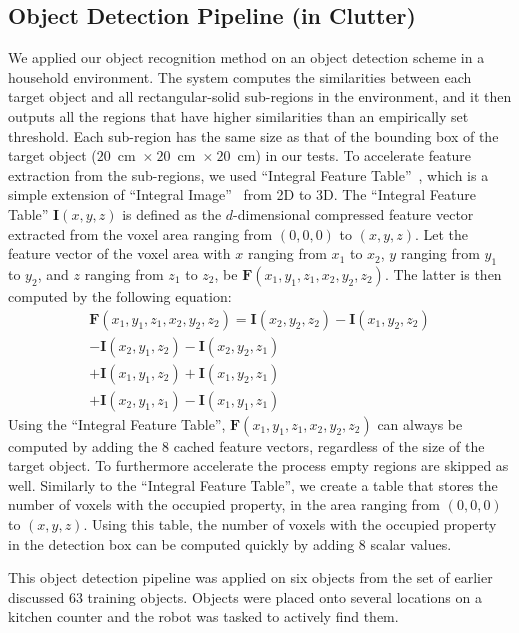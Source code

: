 \documentclass[letterpaper, 10 pt, conference]{sty/ieeeconf}
\begin{document}
\subsection{Object Detection Pipeline (in Clutter)}
\label{sec:recognition}
We applied our object recognition method on an object detection scheme in a household
environment. The system computes the similarities between each target object and all 
rectangular-solid sub-regions in the environment, and it then outputs all the regions
that have higher similarities than an empirically set threshold.
Each sub-region has the same size as that of the bounding box of the target object 
($20$~cm~$\times~20$~cm~$\times~20$~cm) in our tests.
To accelerate feature extraction from the sub-regions, we used ``Integral Feature Table''~\cite{kanezaki2010tvc}, 
which is a simple extension of ``Integral Image''~\cite{integral_image} from 2D to 3D.
The ``Integral Feature Table'' $\bm{I}(x,y,z)$ is defined as the $d$-dimensional 
compressed feature vector extracted from the voxel area ranging from $(0,0,0)$ to $(x,y,z)$.
Let the feature vector of the voxel area with $x$ ranging from $x_1$ to $x_2$,
$y$ ranging from $y_1$ to $y_2$, and $z$ ranging from $z_1$ to $z_2$, be $\bm{F}(x_1,y_1,z_1,x_2,y_2,z_2)$.
The latter is then computed by the following equation:
\begin{eqnarray*}\label{eq:sat}
\bm{F}(x_1,y_1,z_1,x_2,y_2,z_2) = \bm{I}(x_2,y_2,z_2) - \bm{I}(x_1,y_2,z_2)
                           \\ - \bm{I}(x_2,y_1,z_2) - \bm{I}(x_2,y_2,z_1)
                           \\ + \bm{I}(x_1,y_1,z_2) + \bm{I}(x_1,y_2,z_1)
                           \\ + \bm{I}(x_2,y_1,z_1) - \bm{I}(x_1,y_1,z_1)
\end{eqnarray*}
Using the ``Integral Feature Table'', $\bm{F}(x_1,y_1,z_1,x_2,y_2,z_2)$ can always be 
computed by adding the 8 cached feature vectors, regardless of the size of the target object.
To furthermore accelerate the process empty regions are skipped as well.
Similarly to the ``Integral Feature Table'', we create a table that stores
the number of voxels with the occupied property, in the area ranging from $(0,0,0)$ to $(x,y,z)$.
Using this table, the number of voxels with the occupied property in the detection 
box can be computed quickly by adding 8 scalar values.

This object detection pipeline was applied on six objects from the set of 
earlier discussed 63 training objects. Objects were placed onto several locations on a kitchen counter and the robot was tasked to actively find them.
\end{document}
